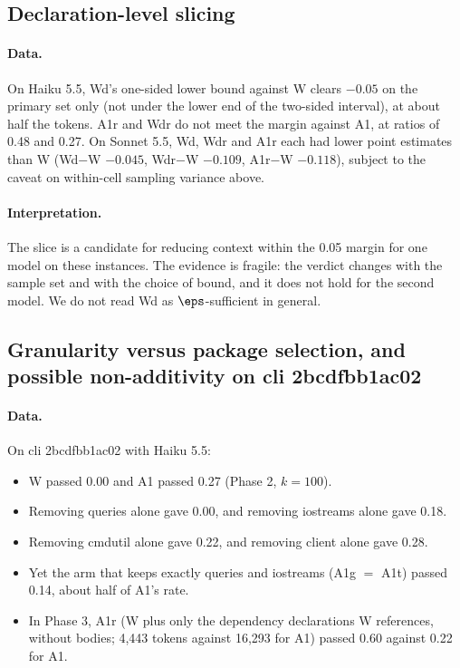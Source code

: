 \subsection{Declaration-level slicing}

\paragraph{Data.} On Haiku 5.5, Wd's one-sided lower bound against W clears $-0.05$ on the primary set only (not under the lower end of the two-sided interval), at about half the tokens. A1r and Wdr do not meet the margin against A1, at ratios of 0.48 and 0.27. On Sonnet 5.5, Wd, Wdr and A1r each had lower point estimates than W (Wd$-$W $-0.045$, Wdr$-$W $-0.109$, A1r$-$W $-0.118$), subject to the caveat on within-cell sampling variance above.

\paragraph{Interpretation.} The slice is a candidate for reducing context within the 0.05 margin for one model on these instances. The evidence is fragile: the verdict changes with the sample set and with the choice of bound, and it does not hold for the second model. We do not read Wd as $\eps$-sufficient in general.

\subsection{Granularity versus package selection, and possible non-additivity on cli 2bcdfbb1ac02}

\paragraph{Data.} On cli 2bcdfbb1ac02 with Haiku 5.5:
\begin{itemize}
\item W passed 0.00 and A1 passed 0.27 (Phase 2, $k=100$).
\item Removing queries alone gave 0.00, and removing iostreams alone gave 0.18.
\item Removing cmdutil alone gave 0.22, and removing client alone gave 0.28.
\item Yet the arm that keeps exactly queries and iostreams (A1g $=$ A1t) passed 0.14, about half of A1's rate.
\item In Phase 3, A1r (W plus only the dependency declarations W references, without bodies; 4,443 tokens against 16,293 for A1) passed 0.60 against 0.22 for A1.
\end{itemize}


